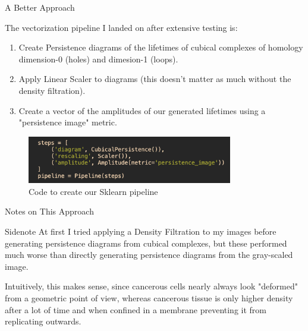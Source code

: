 \documentclass[11pt]{beamer}
\begin{document}
\begin{frame}{A Better Approach}
    \par The vectorization pipeline I landed on after extensive testing is:
    \begin{enumerate}
        \item Create Persistence diagrams of the lifetimes of cubical complexes of homology dimension-0 (holes) and dimesion-1 (loops).
        \item Apply Linear Scaler to diagrams (this doesn't matter as much without the density filtration).
        \item Create a vector of the amplitudes of our generated lifetimes using a "persistence image" metric.
    \end{enumerate}
    
    \begin{figure}
        \caption{Code to create our Sklearn pipeline}
        \centering
        \includegraphics[width=0.8\textwidth]{imagens/pipeline_code.png}
    \end{figure}
    
\end{frame}

\begin{frame}{Notes on This Approach}
    \begin{block}{Sidenote}
    At first I tried applying a Density Filtration to my images before generating persistence diagrams from cubical complexes, but these performed much worse than directly generating persistence diagrams from the gray-scaled image.
    \end{block}

    \vspace{7mm}

    \par Intuitively, this makes sense, since cancerous cells nearly always look "deformed" from a geometric point of view, whereas cancerous tissue is only higher density after a lot of time and when confined in a membrane preventing it from replicating outwards.
\end{frame}
\end{document}
